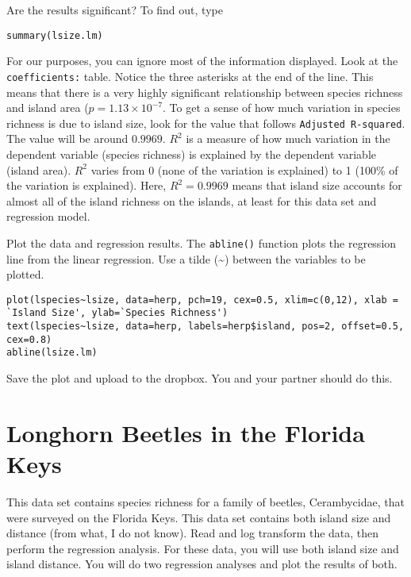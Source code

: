 \documentclass[11pt, oneside]{article}   	%
\begin{document}
Are the results significant?  To find out, type

\begin{lstlisting}
summary(lsize.lm)

\end{lstlisting}

For our purposes, you can ignore most of the information displayed.  Look at the \texttt{coefficients:} table. Notice the three asterisks at the end of the line.  This means that there is a very highly significant relationship between species richness and island area ($p = 1.13 \times 10^{-7}$.  To get a sense of how much variation in species richness is due to island size, look for the value that follows \texttt{Adjusted R-squared}. The value will be around $0.9969$.  $R^2$ is a measure of how much variation in the dependent variable (species richness) is explained by the dependent variable (island area). $R^2$ varies from 0 (none of the variation is explained) to 1 (100\% of the variation is explained). Here, $R^2 = 0.9969$ means that island size accounts for almost all of the island richness on the islands, at least for this data set and regression model.

Plot the data and regression results.  The \texttt{abline()} function plots the regression line from the linear regression.  Use a tilde (\textasciitilde) between the variables to be plotted.

\begin{lstlisting}
plot(lspecies~lsize, data=herp, pch=19, cex=0.5, xlim=c(0,12), xlab = `Island Size', ylab=`Species Richness')
text(lspecies~lsize, data=herp, labels=herp$island, pos=2, offset=0.5, cex=0.8)
abline(lsize.lm)
\end{lstlisting}

Save the plot and upload to the dropbox. You and your partner should do this.


\section{Longhorn Beetles in the Florida Keys}

This data set contains species richness for a family of beetles, Cerambycidae, that were surveyed on the Florida Keys. This data set contains both island size and distance (from what, I do not know).  Read and log transform the data, then perform the regression analysis.  For these data, you will use both island size and island distance.  You will do two regression analyses and plot the results of both.
\end{document}
